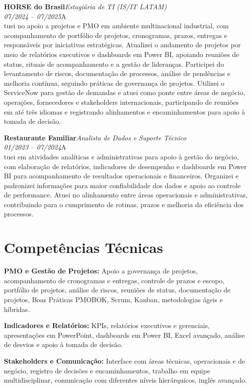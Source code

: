 \documentclass[11pt,a4paper]{article}
\newcommand{\cvrole}[4]{%
  \vspace{4pt}%
  {\bfseries\color{accentcolor}#1}\hfill{\itshape #2}\\[-2pt]%
  {\itshape #3}\hfill #4\\[6pt]%
}
\begin{document}
\cvrole{HORSE do Brasil}{Estagiária de TI (IS/IT LATAM)}{07/2024 -- 07/2025}

Atuei no apoio a projetos e PMO em ambiente multinacional industrial, com acompanhamento de portfólio de projetos, cronogramas, prazos, entregas e responsáveis por iniciativas estratégicas. Atualizei o andamento de projetos por meio de relatórios executivos e dashboards em Power BI, apoiando reuniões de status, rituais de acompanhamento e a gestão de lideranças. Participei do levantamento de riscos, documentação de processos, análise de pendências e melhoria contínua, seguindo práticas de governança de projetos. Utilizei o ServiceNow para gestão de demandas e atuei como ponte entre áreas de negócio, operações, fornecedores e stakeholders internacionais, participando de reuniões em até três idiomas e registrando alinhamentos e encaminhamentos para apoio à tomada de decisão.

\cvrole{Restaurante Familiar}{Analista de Dados e Suporte Técnico}{01/2023 -- 07/2024}

Atuei em atividades analíticas e administrativas para apoio à gestão do negócio, com elaboração de relatórios, indicadores de desempenho e dashboards em Power BI para acompanhamento de resultados operacionais e financeiros. Organizei e padronizei informações para maior confiabilidade dos dados e apoio ao controle de performance. Atuei no alinhamento entre áreas operacionais e administrativas, contribuindo para o cumprimento de rotinas, prazos e melhoria da eficiência dos processos.

\section{Competências Técnicas}

\textbf{PMO e Gestão de Projetos:} Apoio a governança de projetos, acompanhamento de cronogramas e entregas, controle de prazos e escopo, portfólio de projetos, análise de riscos, reuniões de status, documentação de projetos, Boas Práticas PMOBOK, Scrum, Kanban, metodologias ágeis e híbridas.

\textbf{Indicadores e Relatórios:} KPIs, relatórios executivos e gerenciais, apresentações em PowerPoint, dashboards em Power BI, Excel avançado, análise de desvios e apoio à tomada de decisão.

\textbf{Stakeholders e Comunicação:} Interface com áreas técnicas, operacionais e de negócio, registro de decisões e encaminhamentos, trabalho em equipe multidisciplinar, comunicação com diferentes níveis hierárquicos, inglês avançado.
\end{document}
